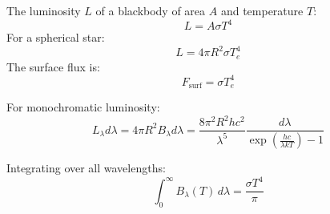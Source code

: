 \documentclass[12pt,a4paper]{book}
\begin{document}
	The luminosity \( L \) of a blackbody of area \( A \) and temperature \( T \):
	\begin{equation}
		L = A \sigma T^4
	\end{equation}
	For a spherical star:
	\begin{equation}
		L = 4\pi R^2 \sigma T_e^4
	\end{equation}
	The surface flux is:
	\begin{equation}
		F_{\text{surf}} = \sigma T_e^4
	\end{equation}
	
	For monochromatic luminosity:
	\begin{equation}
		L_{\lambda} d\lambda = 4\pi R^2 B_{\lambda} d\lambda = \frac{8\pi^2 R^2 hc^2}{\lambda^5} \frac{d\lambda}{\exp\left(\frac{hc}{\lambda kT}\right) - 1}
	\end{equation}
	
	Integrating over all wavelengths:
	\begin{equation}
		\int_0^\infty B_{\lambda}(T) \, d\lambda = \frac{\sigma T^4}{\pi}
	\end{equation}
	
\end{document}
